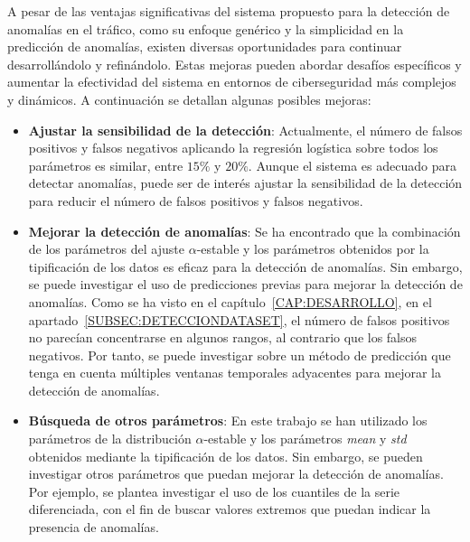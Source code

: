 A pesar de las ventajas significativas del sistema propuesto para la detección de anomalías en el tráfico, como su enfoque genérico y la simplicidad en la predicción de anomalías, existen diversas oportunidades para continuar desarrollándolo y refinándolo. Estas mejoras pueden abordar desafíos específicos y aumentar la efectividad del sistema en entornos de ciberseguridad más complejos y dinámicos. A continuación se detallan algunas posibles mejoras:
\begin{itemize}
    \item \textbf{Ajustar la sensibilidad de la detección}: Actualmente, el número de falsos positivos y falsos negativos aplicando la regresión logística sobre todos los parámetros es similar, entre $15\%$ y $20\%$. Aunque el sistema es adecuado para detectar anomalías, puede ser de interés ajustar la sensibilidad de la detección para reducir el número de falsos positivos y falsos negativos.
    \item \textbf{Mejorar la detección de anomalías}: Se ha encontrado que la combinación de los parámetros del ajuste $\alpha$-estable y los parámetros obtenidos por la tipificación de los datos es eficaz para la detección de anomalías. Sin embargo, se puede investigar el uso de predicciones previas para mejorar la detección de anomalías. Como se ha visto en el capítulo~\ref{CAP:DESARROLLO}, en el apartado~\ref{SUBSEC:DETECCIONDATASET}, el número de falsos positivos no parecían concentrarse en algunos rangos, al contrario que los falsos negativos. Por tanto, se puede investigar sobre un método de predicción que tenga en cuenta múltiples ventanas temporales adyacentes para mejorar la detección de anomalías.
    \item \textbf{Búsqueda de otros parámetros}: En este trabajo se han utilizado los parámetros de la distribución $\alpha$-estable y los parámetros \textit{mean} y \textit{std} obtenidos mediante la tipificación de los datos. Sin embargo, se pueden investigar otros parámetros que puedan mejorar la detección de anomalías. Por ejemplo, se plantea investigar el uso de los cuantiles de la serie diferenciada, con el fin de buscar valores extremos que puedan indicar la presencia de anomalías.
\end{itemize}